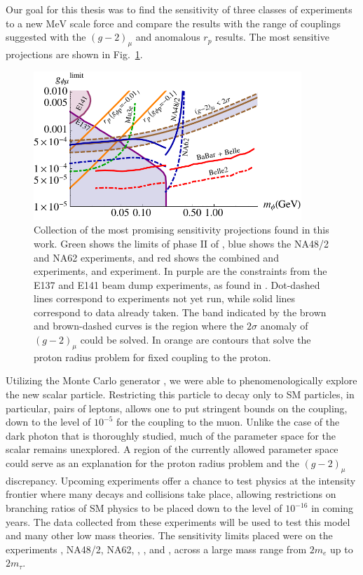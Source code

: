 \label{chapter:conclusion}

Our goal for this thesis was to find the sensitivity of three classes of experiments to a new $\textrm{MeV}$ scale force and compare the results with the range of couplings suggested with the $(g-2)_\mu$ and anomalous $r_p$ results.
The most sensitive projections are shown in Fig.~\ref{fig:best_limits}.

\begin{figure}[h]
    \centering
    \includegraphics[width=0.9\textwidth]{Figures/limits/best_limits}
    \caption[Collection of the most promising sensitivity projections found in this work.]{Collection of the most promising sensitivity projections found in this work. Green shows the limits of phase II of \mueee, blue shows the NA48/2 and NA62 experiments, and red shows the combined \belle and \babar experiments, and \belletwo experiment. In purple are the constraints from the E137 and E141 beam dump experiments, as found in \cite{Batell:2015unpub, Bjorken:2009mm}. Dot-dashed lines correspond to experiments not yet run, while solid lines correspond to data already taken. The band indicated by the brown and brown-dashed curves is the region where the $2\sigma$ anomaly of $(g-2)_\mu$ could be solved. In orange are contours that solve the proton radius problem for fixed coupling to the proton.} 
    \label{fig:best_limits}
\end{figure}

Utilizing the Monte Carlo generator \madgraph, we were able to phenomenologically explore the new scalar particle.
Restricting this particle to decay only to SM particles, in particular, pairs of leptons, allows one to put stringent bounds on the coupling, down to the level of $10^{-5}$ for the coupling to the muon.
Unlike the case of the dark photon that is thoroughly studied, much of the parameter space for the scalar remains unexplored.
A region of the currently allowed parameter space could serve as an explanation for the proton radius problem and the $(g-2)_\mu$ discrepancy.
Upcoming experiments offer a chance to test physics at the intensity frontier where many decays and collisions take place, allowing restrictions on branching ratios of SM physics to be placed down to the level of $10^{-16}$ in coming years.
The data collected from these experiments will be used to test this model and many other low mass theories.
The sensitivity limits placed were on the experiments \mueee, NA48/2, NA62, \babar, \belle, and \belletwo, across a large mass range from $2m_e$ up to $2m_\tau$.

